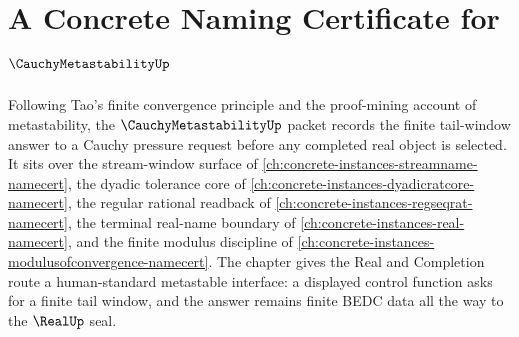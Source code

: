 \chapter{A Concrete Naming Certificate for $\CauchyMetastabilityUp$}
\label{ch:concrete-instances-cauchy-metastability-namecert}

Following Tao's finite convergence principle and the proof-mining account of metastability, the $\CauchyMetastabilityUp$ packet records the finite tail-window answer to a Cauchy pressure request before any completed real object is selected. It sits over the stream-window surface of \autoref{ch:concrete-instances-streamname-namecert}, the dyadic tolerance core of \autoref{ch:concrete-instances-dyadicratcore-namecert}, the regular rational readback of \autoref{ch:concrete-instances-regseqrat-namecert}, the terminal real-name boundary of \autoref{ch:concrete-instances-real-namecert}, and the finite modulus discipline of \autoref{ch:concrete-instances-modulusofconvergence-namecert}. The chapter gives the Real and Completion route a human-standard metastable interface: a displayed control function asks for a finite tail window, and the answer remains finite BEDC data all the way to the $\RealUp$ seal.

